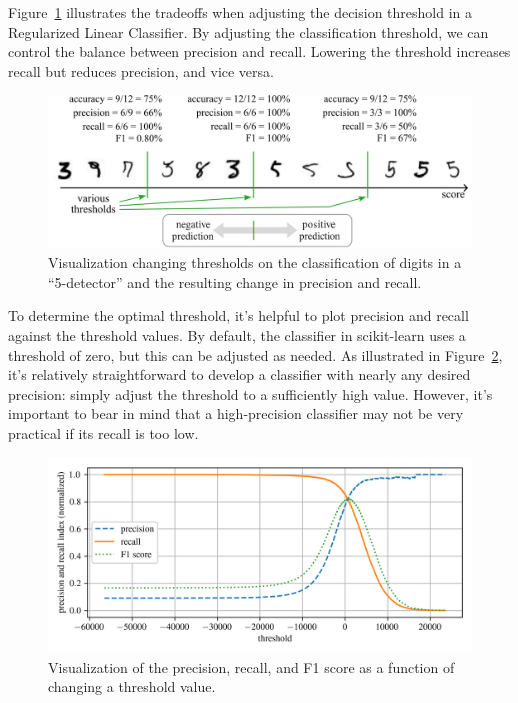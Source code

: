 \documentclass[12pt,letter]{article}
\begin{document}
Figure~\ref{fig:decision_threshold} illustrates the tradeoffs when adjusting the decision threshold in a Regularized Linear Classifier. By adjusting the classification threshold, we can control the balance between precision and recall. Lowering the threshold increases recall but reduces precision, and vice versa. 


\begin{figure}[H]
    \centering
    \includegraphics[width=5.8in]{../figures/decision_threshold.png}
	\vspace{-2ex}
    \caption{Visualization changing thresholds on the classification of digits in a ``5-detector'' and the resulting change in precision and recall.}
    \label{fig:decision_threshold}
\end{figure}

To determine the optimal threshold, it's helpful to plot precision and recall against the threshold values. By default, the classifier in scikit-learn uses a threshold of zero, but this can be adjusted as needed. As illustrated in Figure~\ref{fig:F1_score_plot}, it's relatively straightforward to develop a classifier with nearly any desired precision: simply adjust the threshold to a sufficiently high value. However, it's important to bear in mind that a high-precision classifier may not be very practical if its recall is too low. 




\begin{figure}[H]
    \centering
	\vspace{-2ex}
    \includegraphics[width=5.8in]{../figures/F1_score_plot.png}
	\vspace{-3ex}
    \caption{Visualization of the precision, recall, and F1 score as a function of changing a threshold value. }
	\vspace{-1ex}
    \label{fig:F1_score_plot}
\end{figure}
\end{document}
